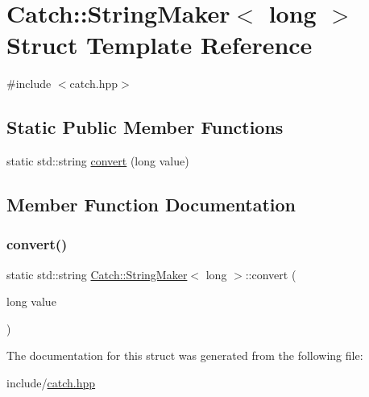 \hypertarget{struct_catch_1_1_string_maker_3_01long_01_4}{}\section{Catch\+::String\+Maker$<$ long $>$ Struct Template Reference}
\label{struct_catch_1_1_string_maker_3_01long_01_4}


{\ttfamily \#include $<$catch.\+hpp$>$}

\subsection*{Static Public Member Functions}
\begin{DoxyCompactItemize}
\item 
static std\+::string \mbox{\hyperlink{struct_catch_1_1_string_maker_3_01long_01_4_a1c0c56497813e7a6425c5411d5e66447}{convert}} (long value)
\end{DoxyCompactItemize}


\subsection{Member Function Documentation}
\mbox{\label{struct_catch_1_1_string_maker_3_01long_01_4_a1c0c56497813e7a6425c5411d5e66447}} 
\subsubsection{\texorpdfstring{convert()}{convert()}}
{\footnotesize\ttfamily static std\+::string \mbox{\hyperlink{struct_catch_1_1_string_maker}{Catch\+::\+String\+Maker}}$<$ long $>$\+::convert (\begin{DoxyParamCaption}\item[{long}]{value }\end{DoxyParamCaption})\hspace{0.3cm}{\ttfamily [static]}}



The documentation for this struct was generated from the following file\+:\begin{DoxyCompactItemize}
\item 
include/\mbox{\hyperlink{catch_8hpp}{catch.\+hpp}}\end{DoxyCompactItemize}
